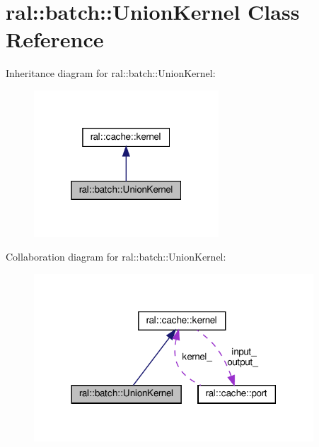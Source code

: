 \hypertarget{classral_1_1batch_1_1UnionKernel}{}\section{ral\+:\+:batch\+:\+:Union\+Kernel Class Reference}
\label{classral_1_1batch_1_1UnionKernel}


Inheritance diagram for ral\+:\+:batch\+:\+:Union\+Kernel\+:\nopagebreak
\begin{figure}[H]
\begin{center}
\leavevmode
\includegraphics[width=196pt]{classral_1_1batch_1_1UnionKernel__inherit__graph}
\end{center}
\end{figure}


Collaboration diagram for ral\+:\+:batch\+:\+:Union\+Kernel\+:\nopagebreak
\begin{figure}[H]
\begin{center}
\leavevmode
\includegraphics[width=296pt]{classral_1_1batch_1_1UnionKernel__coll__graph}
\end{center}
\end{figure}

